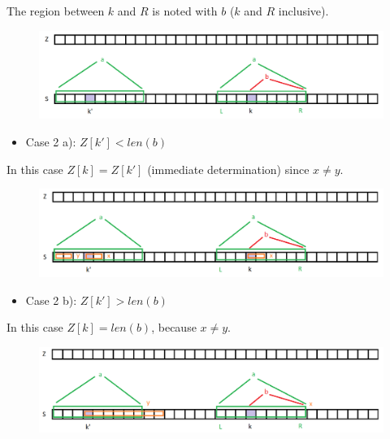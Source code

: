 \documentclass[letterpaper]{article}
\begin{document}
The region between $k$ and $R$ is noted with $b$ ($k$ and $R$ inclusive).

\begin{figure} [h!]
\centering
\includegraphics[width=1\textwidth]{pngOfDiagrams/zalgo3.png}
\end{figure}

\newpage

\begin{itemize}
    \item Case 2 a): $Z[k'] < len(b)$
\end{itemize}

In this case $Z[k] = Z[k']$ (immediate determination) since $x \neq y$.

\begin{figure} [h!]
\centering
\includegraphics[width=1\textwidth]{pngOfDiagrams/zalgo4.png}
\end{figure}

\begin{itemize}
    \item Case 2 b): $Z[k'] > len(b)$
\end{itemize}

In this case $Z[k] = len(b)$, because $x \neq y$.

\begin{figure} [h!]
\centering
\includegraphics[width=1\textwidth]{pngOfDiagrams/zalgo5.png}
\end{figure}
\end{document}
